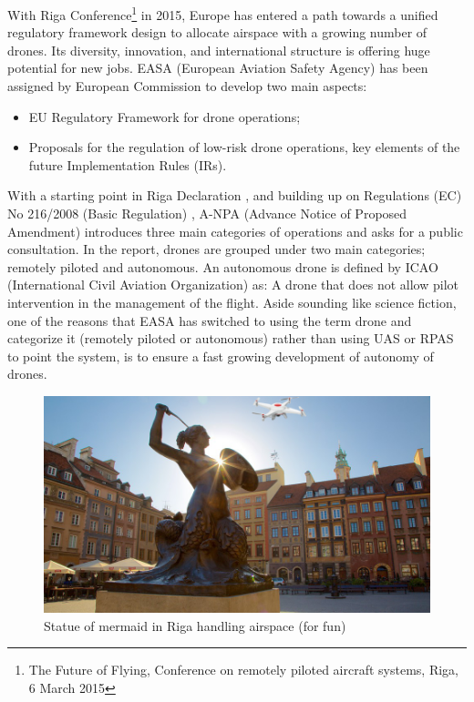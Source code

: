 With Riga Conference\footnote{The Future of Flying, Conference on remotely piloted aircraft systems, Riga, 6 March 2015} in 2015, Europe has entered a path towards a unified regulatory framework design to allocate airspace with a growing number of drones. 
Its diversity, innovation, and international structure is offering huge potential for new jobs. 
EASA (European Aviation Safety Agency) has been assigned by European Commission to develop two main aspects:

\begin{itemize}
\item{EU Regulatory Framework for drone operations;}
\item{Proposals for the regulation of low-risk drone operations, key elements of the future Implementation Rules (IRs).}
\end{itemize}


With a starting point in Riga Declaration \cite{rigaDeclaration}, and building up on Regulations (EC) No 216/2008 (Basic Regulation) \cite{basicRegulation}, A-NPA (Advance Notice of Proposed Amendment) \cite{A_NPA_EASA2015} introduces three main categories of operations and asks for a public consultation. 
In the report, drones are grouped under two main categories; remotely piloted and autonomous. 
An autonomous drone is defined by ICAO (International Civil Aviation Organization) \cite{ICAO_RPASmanuel} as: A drone that does not allow pilot intervention in the management of the flight. 
Aside sounding like science fiction, one of the reasons that EASA has switched to using the term drone and categorize it (remotely piloted or autonomous) rather than using UAS or RPAS to point the system, is to ensure a fast growing development of autonomy of drones.

\begin{figure}
\begin{center}
\includegraphics[width=11.3cm]{figures/mermaid_statue_drone}
\caption{Statue of mermaid in Riga handling airspace (for fun)} 
\label{fig:mermaid_statue_drone}
\end{center}
\end{figure}



